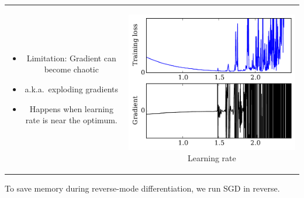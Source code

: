 \documentclass[landscape,a0b,final,a4resizeable]{include/a0poster}
\begin{document}
\begin{poster}
\begin{multicols}{3}
\newpage %





\begin{tabular}{cc}
\begin{minipage}[c]{0.4\columnwidth}
\begin{itemize}
\item Limitation: Gradient can become chaotic
\item a.k.a.\ exploding gradients
\item Happens when learning rate is near the optimum.
\end{itemize}
\end{minipage} & 
\begin{minipage}[c]{0.55\columnwidth}
\begin{center}
\includegraphics[width=\columnwidth]{../experiments/Jan_14_learning_rate_wiggliness/3/chaos.pdf}
Learning rate
\end{center}
\end{minipage}
\end{tabular}

\vspace{0.5em}


To save memory during reverse-mode differentiation, we run SGD in reverse.


\end{multicols}
\end{poster}
\end{document}
